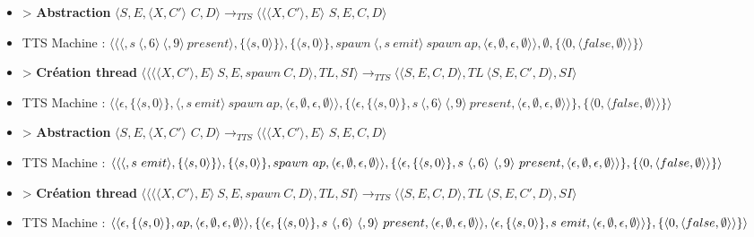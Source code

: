 \documentclass[10pt,a4paper]{report}
\begin{document}
\begin{itemize}
\item[] > \textbf{Abstraction} 	$\langle S,E,\langle X,C'\rangle$ $C,D\rangle
  \longrightarrow_{TTS} 
  \langle \langle\langle X,C'\rangle,E\rangle$ $S,E,C,D\rangle$
\item[] TTS Machine : $\langle \langle\langle ,s~\langle,6\rangle~\langle,9\rangle~present\rangle,\{\langle s,0\rangle\}\rangle,\{\langle s,0\rangle\},spawn~\langle ,s~emit\rangle~spawn~ap,\langle \epsilon,\emptyset,\epsilon,\emptyset\rangle\rangle,\emptyset,\{\langle 0,\langle false,\emptyset\rangle\rangle\}\rangle$ 
\item[] > \textbf{Création thread} $\langle\langle\langle\langle X,C'\rangle, E\rangle~S,E,spawn~C,D\rangle,TL,SI\rangle 
  \longrightarrow_{TTS} 
  \langle\langle S,E,C,D\rangle,TL~\langle S,E,C',D\rangle,SI\rangle$
\item[] TTS Machine : $\langle\langle\epsilon,\{\langle s,0\rangle\},\langle ,s~emit\rangle~spawn~ap,\langle \epsilon,\emptyset,\epsilon,\emptyset\rangle\rangle,\{\langle\epsilon,\{\langle s,0\rangle\},s~\langle,6\rangle~\langle,9\rangle~present,\langle \epsilon,\emptyset,\epsilon,\emptyset\rangle\rangle\},\{\langle 0,\langle false,\emptyset\rangle\rangle\}\rangle$ 
\item[] > \textbf{Abstraction} 	$\langle S,E,\langle X,C'\rangle$ $C,D\rangle
  \longrightarrow_{TTS} 
  \langle \langle\langle X,C'\rangle,E\rangle$ $S,E,C,D\rangle$
\item[] TTS Machine : $\langle \langle\langle ,s~emit\rangle,\{\langle s,0\rangle\}\rangle,\{\langle s,0\rangle\},spawn~ap,\langle \epsilon,\emptyset,\epsilon,\emptyset\rangle\rangle,\{\langle\epsilon,\{\langle s,0\rangle\},s~\langle,6\rangle~\langle,9\rangle~present,\langle \epsilon,\emptyset,\epsilon,\emptyset\rangle\rangle\}\\,\{\langle 0,\langle false,\emptyset\rangle\rangle\}\rangle$ 
\item[] > \textbf{Création thread} $\langle\langle\langle\langle X,C'\rangle, E\rangle~S,E,spawn~C,D\rangle,TL,SI\rangle 
  \longrightarrow_{TTS} 
  \langle\langle S,E,C,D\rangle,TL~\langle S,E,C',D\rangle,SI\rangle$
\item[] TTS Machine : $\langle\langle\epsilon,\{\langle s,0\rangle\},ap,\langle \epsilon,\emptyset,\epsilon,\emptyset\rangle\rangle,\{\langle\epsilon,\{\langle s,0\rangle\},s~\langle,6\rangle~\langle,9\rangle~present,\langle \epsilon,\emptyset,\epsilon,\emptyset\rangle\rangle,\langle\epsilon,\{\langle s,0\rangle\},s~emit,\langle \epsilon,\emptyset,\epsilon,\emptyset\rangle\rangle\}\\,\{\langle 0,\langle false,\emptyset\rangle\rangle\}\rangle$ 

\end{itemize}
\end{document}
